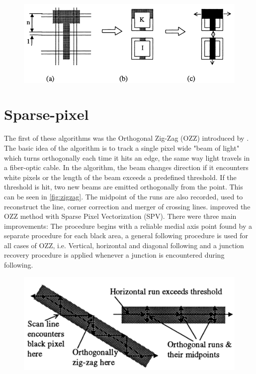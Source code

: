\begin{figure}[H]
	\centering
	\includegraphics[width=0.8\linewidth]{fig/meshpattern.png}
	\label{fig:meshpattern}
\end{figure}

\section{Sparse-pixel}
The first of these algorithms was the Orthogonal Zig-Zag (OZZ) introduced by \citet{Dori1997}. The basic idea of the algorithm is to track a single pixel wide "beam of light" which turns orthogonally each time it hits an edge, the same way light travels in a fiber-optic cable. In the algorithm, the beam changes direction if it encounters white pixels or the length of the beam exceeds a predefined threshold. If the threshold is hit, two new beams are emitted orthogonally from the point. This can be seen in \autoref{fig:zigzag}. The midpoint of the runs are also recorded, used to reconstruct the line, corner correction and merger of crossing lines. \citet{Wenyin1996} improved the OZZ method with Sparse Pixel Vectorization (SPV). There were three main improvements: The procedure begins with a reliable medial axis point found by a separate procedure for each black area, a general following procedure is used for all cases of OZZ, i.e. Vertical, horizontal and diagonal following and a junction recovery procedure is applied whenever a junction is encountered during following.

\begin{figure}[H]
	\centering
	\includegraphics[width=0.8\linewidth]{fig/zigzag.png}
	\label{fig:zigzag}
\end{figure}